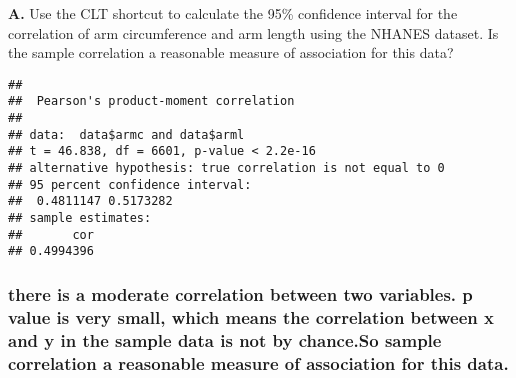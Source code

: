 \documentclass[
]{article}
\newenvironment{Shaded}{\begin{snugshade}}{\end{snugshade}}
\newcommand{\FunctionTok}[1]{\textcolor[rgb]{0.00,0.00,0.00}{#1}}
\newcommand{\NormalTok}[1]{#1}
\newcommand{\OtherTok}[1]{\textcolor[rgb]{0.56,0.35,0.01}{#1}}
\newcommand{\SpecialCharTok}[1]{\textcolor[rgb]{0.00,0.00,0.00}{#1}}
\begin{document}
\textbf{A.} Use the CLT shortcut to calculate the 95\% confidence
interval for the correlation of arm circumference and arm length using
the NHANES dataset. Is the sample correlation a reasonable measure of
association for this data?

\begin{Shaded}
\end{Shaded}

\begin{verbatim}
## 
##  Pearson's product-moment correlation
## 
## data:  data$armc and data$arml
## t = 46.838, df = 6601, p-value < 2.2e-16
## alternative hypothesis: true correlation is not equal to 0
## 95 percent confidence interval:
##  0.4811147 0.5173282
## sample estimates:
##       cor 
## 0.4994396
\end{verbatim}

\hypertarget{there-is-a-moderate-correlation-between-two-variables.-p-value-is-very-small-which-means-the-correlation-between-x-and-y-in-the-sample-data-is-not-by-chance.so-sample-correlation-a-reasonable-measure-of-association-for-this-data.}{%
\subsubsection{there is a moderate correlation between two variables. p
value is very small, which means the correlation between x and y in the
sample data is not by chance.So sample correlation a reasonable measure
of association for this
data.}\label{there-is-a-moderate-correlation-between-two-variables.-p-value-is-very-small-which-means-the-correlation-between-x-and-y-in-the-sample-data-is-not-by-chance.so-sample-correlation-a-reasonable-measure-of-association-for-this-data.}}
\end{document}
